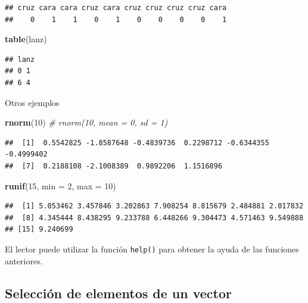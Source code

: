 \documentclass[]{book}
\newenvironment{Shaded}{\begin{snugshade}}{\end{snugshade}}
\newcommand{\KeywordTok}[1]{\textcolor[rgb]{0.13,0.29,0.53}{\textbf{#1}}}
\newcommand{\DataTypeTok}[1]{\textcolor[rgb]{0.13,0.29,0.53}{#1}}
\newcommand{\DecValTok}[1]{\textcolor[rgb]{0.00,0.00,0.81}{#1}}
\newcommand{\CommentTok}[1]{\textcolor[rgb]{0.56,0.35,0.01}{\textit{#1}}}
\newcommand{\NormalTok}[1]{#1}
\begin{document}
\begin{verbatim}
## cruz cara cara cruz cara cruz cruz cruz cruz cara 
##    0    1    1    0    1    0    0    0    0    1
\end{verbatim}

\begin{Shaded}
\begin{Highlighting}[]
\KeywordTok{table}\NormalTok{(lanz)}
\end{Highlighting}
\end{Shaded}

\begin{verbatim}
## lanz
## 0 1 
## 6 4
\end{verbatim}

Otros ejemplos

\begin{Shaded}
\begin{Highlighting}[]
\KeywordTok{rnorm}\NormalTok{(}\DecValTok{10}\NormalTok{)  }\CommentTok{# rnorm(10, mean = 0, sd = 1)}
\end{Highlighting}
\end{Shaded}

\begin{verbatim}
##  [1]  0.5542825 -1.8587648 -0.4839736  0.2298712 -0.6344355 -0.4999402
##  [7]  0.2188108 -2.1008389  0.9892206  1.1516896
\end{verbatim}

\begin{Shaded}
\begin{Highlighting}[]
\KeywordTok{runif}\NormalTok{(}\DecValTok{15}\NormalTok{, }\DataTypeTok{min =} \DecValTok{2}\NormalTok{, }\DataTypeTok{max =} \DecValTok{10}\NormalTok{)}
\end{Highlighting}
\end{Shaded}

\begin{verbatim}
##  [1] 5.053462 3.457846 3.202863 7.908254 8.815679 2.484881 2.017832
##  [8] 4.345444 8.438295 9.233788 6.448266 9.304473 4.571463 9.549888
## [15] 9.240699
\end{verbatim}

El lector puede utilizar la función \texttt{help()} para obtener la
ayuda de las funciones anteriores.

\subsection{Selección de elementos de un
vector}\label{seleccion-de-elementos-de-un-vector}
\end{document}
